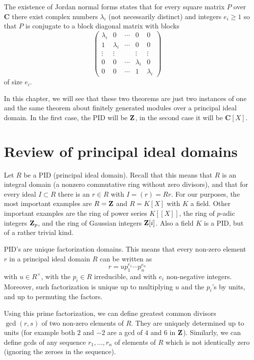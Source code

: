 \documentclass[11pt]{amsbook}
\def\bC{{\mathbf{C}}} \def\bP{{\mathbf{P}}} \def\bA{{\mathbf{A}}}
\theoremstyle{plain}
\theoremstyle{definition}
\begin{document}
 The existence of Jordan normal forms states that for every square matrix $P$ over $\bC$ there exist
 complex numbers $\lambda_i$ (not necessarily distinct) and integers $e_i \geq 1$ so that
 $P$ is conjugate to a block diagonal matrix with blocks
\[
\left(\begin{matrix} \lambda_i & 0 &   \cdots & 0 & 0 \\ 
	1 & \lambda_i &  \cdots & 0 & 0 \\
	\vdots & \vdots &  & \vdots & \vdots \\ 
	0 & 0 &  \cdots & \lambda_i & 0 \\
	0 & 0 &   \cdots & 1& \lambda_i \end{matrix} \right)
\] 
of size $e_i$.
 
In this chapter, we will see that these two theorems are just two instances of one and the same theorem about finitely generated modules over a principal  ideal domain. In the first case, the PID will be ${\mathbf{Z}}$, in the second case it will be $\bC[X]$.



\section{Review of principal ideal domains}

Let $R$ be a PID (principal ideal domain). Recall that this means that $R$ is an integral domain (a nonzero commutative ring without zero divisors), and that for every ideal $I\subset R$ there is an $r\in R$ with $I=(r)=Rr$. For our purposes, the most important examples are $R={\mathbf{Z}}$ and $R=K[X]$ with $K$ a field. Other important examples are the ring of power series $K[[X]]$, the ring of $p$-adic integers ${\mathbf{Z}}_p$, and the ring of Gaussian integers ${\mathbf{Z}}[i]$. Also a field $K$ is a PID, but of a rather trivial kind.

PID's are unique factorization domains. This means that every non-zero element $r$ in a principal ideal domain $R$ can be written as
\[
	r = u p_1^{e_1} \cdots p_n^{e_n}
\]
with $u \in R^\times$, with the $p_i \in R$ irreducible, and with $e_i$ non-negative integers. Moreover, such factorization is unique up to multiplying $u$ and the $p_i$'s by units, and up to permuting the factors.

Using this prime factorization, we can define greatest common divisors  $\gcd(r,s)$ of two non-zero elements of $R$. They are uniquely determined up to units (for example both $2$ and $-2$ are a gcd of $4$ and $6$ in ${\mathbf{Z}}$). Similarly, we can define gcds of any sequence $r_1,\ldots,r_n$ of elements of $R$ which is not identically zero (ignoring the zeroes in the sequence).
\end{document}
